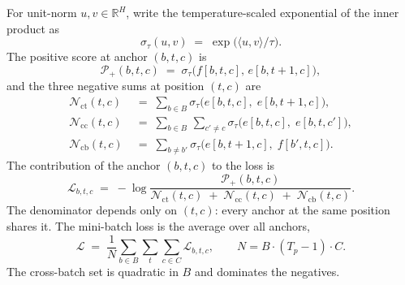 For unit-norm $u, v \in \mathbb{R}^H$, write the temperature-scaled
exponential of the inner product as
\[
  \sigma_\tau(u, v) \;=\; \exp\!\big(\langle u, v \rangle / \tau\big).
\]
The positive score at anchor $(b, t, c)$ is
\[
  \mathcal{P}_+(b, t, c) \;=\;
  \sigma_\tau\!\big(f[b, t, c],\, e[b, t+1, c]\big),
\]
and the three negative sums at position $(t, c)$ are
\begin{align*}
  \mathcal{N}_{\mathrm{ct}}(t, c)
    &\;=\; \sum_{b \in B}
      \sigma_\tau\!\big(e[b, t, c],\; e[b, t+1, c]\big),\\
  \mathcal{N}_{\mathrm{cc}}(t, c)
    &\;=\; \sum_{b \in B} \, \sum_{c' \neq c}
      \sigma_\tau\!\big(e[b, t, c],\; e[b, t, c']\big),\\
  \mathcal{N}_{\mathrm{cb}}(t, c)
    &\;=\; \sum_{b \neq b'}
      \sigma_\tau\!\big(e[b, t+1, c],\; f[b', t, c]\big).
\end{align*}
The contribution of the anchor $(b, t, c)$ to the loss is
\begin{equation}
  \mathcal{L}_{b, t, c}
  \;=\; -\log \frac{\mathcal{P}_+(b, t, c)}
  {\mathcal{N}_{\mathrm{ct}}(t, c) \;+\;
   \mathcal{N}_{\mathrm{cc}}(t, c) \;+\;
   \mathcal{N}_{\mathrm{cb}}(t, c)}.
  \label{eq:loss-anchor}
\end{equation}
The denominator depends only on $(t, c)$: every anchor at the same
position shares it. The mini-batch loss is
the average over all anchors,
\begin{equation}
  \mathcal{L} \;=\; \frac{1}{N}
  \sum_{b \in B} \sum_{t} \sum_{c \in C}
  \mathcal{L}_{b, t, c},
  \qquad N = B \cdot (T_p - 1) \cdot C.
  \label{eq:loss-batch}
\end{equation}
The cross-batch set is quadratic in $B$ and dominates the negatives.
